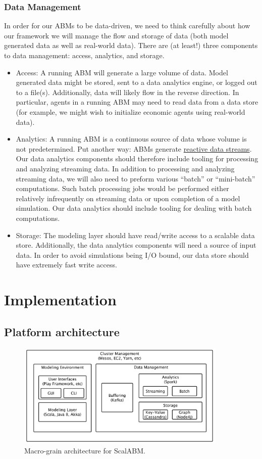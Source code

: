 \documentclass[11pt]{amsart}
\begin{document}
\subsubsection{Data Management}
In order for our ABMs to be data-driven, we need to think carefully about how our framework we will manage the flow and storage of data (both model generated data as well as real-world data). There are (at least!) three components to data management: access, analytics, and storage.
\begin{itemize}
    \item Access: A running ABM will generate a large volume of data. Model generated data might be stored, sent to a data analytics engine, or logged out to a file(s). Additionally, data will likely flow in the reverse direction.  In particular, agents in a running ABM may need to read data from a data store (for example, we might wish to initialize economic agents using real-world data).
    \item Analytics: A running ABM is a continuous source of data whose volume is not predetermined. Put another way: ABMs generate \href{http://www.reactive-streams.org/}{reactive data streams}.  Our data analytics components should therefore include tooling for processing and analyzing streaming data. In addition to processing and analyzing streaming data, we will also need to preform various ``batch'' or ``mini-batch'' computations. Such batch processing jobs would be performed either relatively infrequently on streaming data or upon completion of a model simulation. Our data analytics should include tooling for dealing with batch computations.
    \item Storage: The modeling layer should have read/write access to a scalable data store. Additionally, the data analytics components will need a source of input data. In order to avoid simulations being I/O bound, our data store should have extremely fast write access.
\end{itemize}

\section{Implementation}

\subsection{Platform architecture}

\begin{figure}[H]
\centering
\includegraphics[width=10cm]{img/coarse-grain-schema-2.pdf}
\caption{Macro-grain architecture for ScalABM. }
\end{figure}
\end{document}
